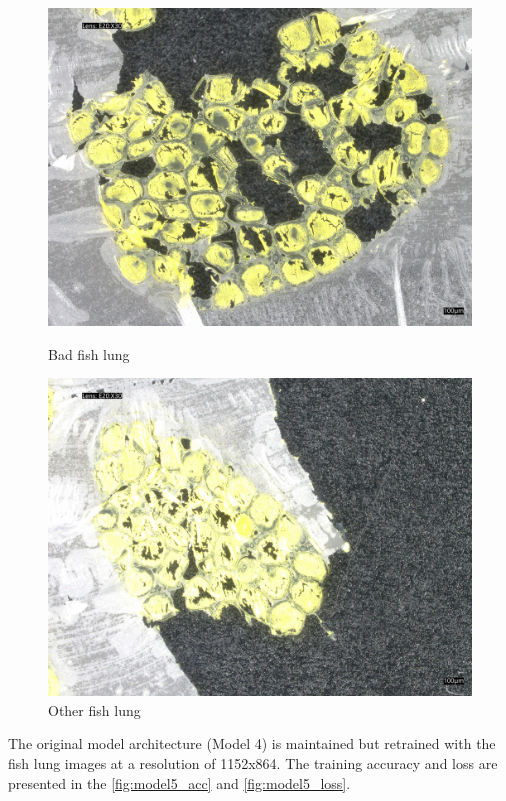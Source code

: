 \begin{figure}[H]
\begin{minipage}{0.24\textwidth}
        \centering
        \includegraphics[width=\textwidth]{./fig/fish_lung/bad20240313_140952.jpg}
        \caption{Bad fish lung}
        \label{fig:bad_fish_lung}
    \end{minipage}
    \begin{minipage}{0.24\textwidth}
        \centering
        \includegraphics[width=\textwidth]{./fig/fish_lung/other20240313_141858.jpg}
        \caption{Other fish lung}
        \label{fig:other_fish_lung}
    \end{minipage}
\end{figure}

The original model architecture (Model 4) is maintained but retrained with the fish lung images at a resolution of 1152x864. The training accuracy and loss are presented in the \autoref{fig:model5_acc} and \autoref{fig:model5_loss}.

